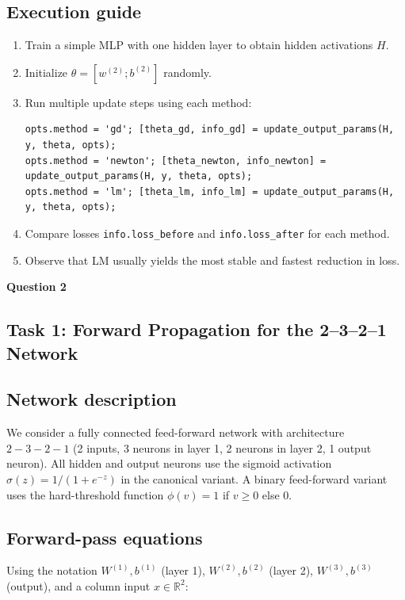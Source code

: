 \documentclass[11pt,a4paper]{article}
\begin{document}
\subsection*{Execution guide}
\begin{enumerate}
  \item Train a simple MLP with one hidden layer to obtain hidden activations $H$.
  \item Initialize $\theta = [w^{(2)}; b^{(2)}]$ randomly.
  \item Run multiple update steps using each method:
        \begin{verbatim}
opts.method = 'gd'; [theta_gd, info_gd] = update_output_params(H, y, theta, opts);
opts.method = 'newton'; [theta_newton, info_newton] = update_output_params(H, y, theta, opts);
opts.method = 'lm'; [theta_lm, info_lm] = update_output_params(H, y, theta, opts);
        \end{verbatim}
  \item Compare losses \texttt{info.loss\_before} and \texttt{info.loss\_after}
        for each method.
  \item Observe that LM usually yields the most stable and fastest reduction in loss.
\end{enumerate}



\vspace{1cm} 
\begin{center}
\textbf{\Large Question 2}
\end{center}


\subsection{Task 1: Forward Propagation for the 2--3--2--1 Network}

\subsection*{Network description}
We consider a fully connected feed-forward network with architecture
\(2\!-\!3\!-\!2\!-\!1\) (2 inputs, 3 neurons in layer 1, 2 neurons in layer 2,
1 output neuron). All hidden and output neurons use the sigmoid
activation \(\sigma(z)=1/(1+e^{-z})\) in the canonical variant. A binary
feed-forward variant uses the hard-threshold function
\(\phi(v)=1\) if \(v\ge0\) else \(0\).

\subsection*{Forward-pass equations}
Using the notation \(W^{(1)},b^{(1)}\) (layer 1), \(W^{(2)},b^{(2)}\) (layer 2),
\(W^{(3)},b^{(3)}\) (output), and a column input \(x\in\mathbb{R}^2\):
\end{document}
